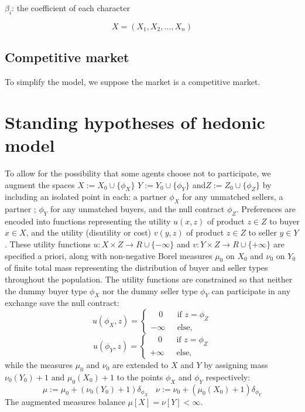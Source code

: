 \documentclass[12pt]{article}
\begin{document}
$\beta_{i}$: the coefficient of each character

$$X=(X_{1},X_{2},\ldots,X_{n})$$

\subsection{Competitive market}
To simplify the model, we suppose the market is a competitive market.
\section{Standing hypotheses of hedonic model}
To allow for the possibility that some agents choose not
to participate, we augment the spaces $X := X_{0}\cup \{\phi_{X}\}$ $Y := Y_{0}\cup \{\phi_{Y}\}$  and$
Z := Z_{0}\cup \{\phi_{Z}\}$  by including an isolated point in each: a partner $\phi_{X}$ for any
unmatched sellers, a partner ; $\phi_{Y}$ for any unmatched buyers, and the null contract $\phi_{Z}$. Preferences are encoded into functions representing the utility $u(x,z)$ of product $z\in Z$ to buyer $x\in X$, and the utility (disutility or cost) $v(y,z)$ of
product $z \in Z$ to seller $y \in Y$ . These utility functions $u : X \times Z \rightarrow R\cup \{-\infty\}$
and $v : Y \times Z \rightarrow R\cup \{+\infty\}$ are specified a priori, along with non-negative Borel measures $\mu_{0}$ on $X_{0}$ and $\nu_{0}$ on $Y_{0}$ of finite total mass representing the distribution of buyer and seller types throughout the population. The utility functions
are constrained so that neither the dummy buyer type $\phi_{X}$ nor the dummy seller
type $\phi_{Y}$ can participate in any exchange save the null contract:
\begin{equation*}
u(\phi_{X},z)=
\left\{\begin{aligned}
\quad
0&\ \ \ \text{if $z=\phi_{Z}$}\\
-\infty&\ \ \ \text{else},
\end{aligned}
\right.
\end{equation*}
\begin{equation}
u(\phi_{Y},z)=
\left\{\begin{aligned}
\quad
0&\ \ \ \text{if $z=\phi_{Z}$}\\
+\infty&\ \ \ \text{else},
\end{aligned}
\right.
\end{equation}
while the measures $\mu_{0}$ and $\nu_{0}$ are extended to $X$ and $Y$ by assigning mass
$\nu_{0}(Y_{0}) + 1$ and $\mu_{0}(X_{0}) + 1$ to the points $\phi_{X}$ and $\phi_{Y}$ respectively:
\begin{equation}
\mu:=\mu_{0} + (\nu_{0}(Y_{0}) + 1)\delta_{\phi_{X}}\ \ \ \ \nu:=\nu_{0} + (\mu_{0}(X_{0}) + 1)\delta_{\phi_{Y}}
\end{equation}
The augmented measures balance $\mu[X] = \nu[Y] < \infty$.
\end{document}
